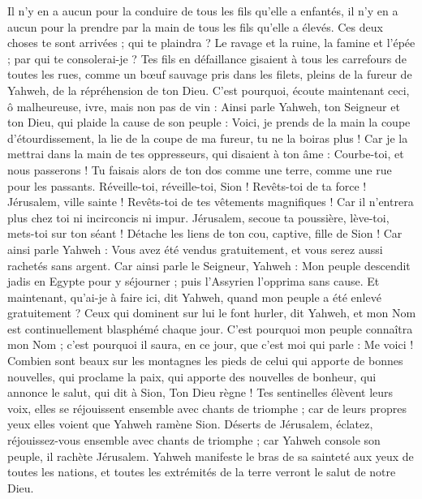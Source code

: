 \begin{multicols}{2}
Il n'y en a aucun pour la conduire de tous les fils qu'elle a enfantés, il n'y en a aucun pour la prendre par la main de tous les fils qu'elle a élevés.
Ces deux choses te sont arrivées ; qui te plaindra ? Le ravage et la ruine, la famine et l'épée ; par qui te consolerai-je ?
Tes fils en défaillance gisaient à tous les carrefours de toutes les rues, comme un bœuf sauvage pris dans les filets, pleins de la fureur de Yahweh, de la répréhension de ton Dieu.
C'est pourquoi, écoute maintenant ceci, ô malheureuse, ivre, mais non pas de vin :
Ainsi parle Yahweh, ton Seigneur et ton Dieu, qui plaide la cause de son peuple : Voici, je prends de la main la coupe d'étourdissement, la lie de la coupe de ma fureur, tu ne la boiras plus !
Car je la mettrai dans la main de tes oppresseurs, qui disaient à ton âme : Courbe-toi, et nous passerons ! Tu faisais alors de ton dos comme une terre, comme une rue pour les passants.
\VerseOne{}Réveille-toi, réveille-toi, Sion ! Revêts-toi de ta force ! Jérusalem, ville sainte ! Revêts-toi de tes vêtements magnifiques ! Car il n'entrera plus chez toi ni incirconcis ni impur.
Jérusalem, secoue ta poussière, lève-toi, mets-toi sur ton séant ! Détache les liens de ton cou, captive, fille de Sion !
Car ainsi parle Yahweh : Vous avez été vendus gratuitement, et vous serez aussi rachetés sans argent.
Car ainsi parle le Seigneur, Yahweh : Mon peuple descendit jadis en Egypte pour y séjourner ; puis l'Assyrien l'opprima sans cause.
Et maintenant, qu'ai-je à faire ici, dit Yahweh, quand mon peuple a été enlevé gratuitement ? Ceux qui dominent sur lui le font hurler, dit Yahweh, et mon Nom est continuellement blasphémé chaque jour.
C'est pourquoi mon peuple connaîtra mon Nom ; c'est pourquoi il saura, en ce jour, que c'est moi qui parle : Me voici !
Combien sont beaux sur les montagnes les pieds de celui qui apporte de bonnes nouvelles, qui proclame la paix, qui apporte des nouvelles de bonheur, qui annonce le salut, qui dit à Sion, Ton Dieu règne !
Tes sentinelles élèvent leurs voix, elles se réjouissent ensemble avec chants de triomphe ; car de leurs propres yeux elles voient que Yahweh ramène Sion.
Déserts de Jérusalem, éclatez, réjouissez-vous ensemble avec chants de triomphe ; car Yahweh console son peuple, il rachète Jérusalem.
Yahweh manifeste le bras de sa sainteté aux yeux de toutes les nations, et toutes les extrémités de la terre verront le salut de notre Dieu.

\end{multicols}
